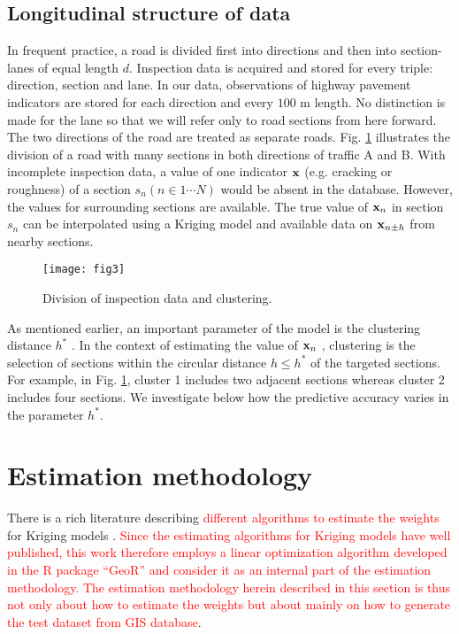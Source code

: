 \documentclass[Journal]{ascelike}
\begin{document}
\subsection{Longitudinal structure of data} \label{krigmodel2}
In frequent practice, a road is divided first into directions and then into section-lanes of equal length $d$. 
Inspection data is acquired and stored for every triple: direction, section and lane. In our data, observations of 
highway pavement indicators are stored for each direction and every $100$ m length. No distinction is made for the lane 
so that we will refer only to road sections from here forward. The two directions of the road are treated as separate 
roads. Fig. \ref{fig3} illustrates the division of a road with many sections in both directions of traffic A and B. With 
incomplete inspection data, a value of one indicator $\bold x$ (e.g. cracking or roughness) of a section $s_n(n \in 1 \cdots 
N )$ would be absent in the database. However, the values for surrounding sections are available. The true value of 
$\bold x_n$ in section $s_n$ can be interpolated using a Kriging model and available data on $\bold x_{n\pm h}$ from nearby 
sections.

%
\begin{figure}
\centering
\texttt{[image: fig3]} 
\caption{Division of inspection data and clustering.} 
\label{fig3}
\end{figure}
%

As mentioned earlier, an important parameter of the model is the clustering distance $h^*$ . In
the context of estimating the value of $\bold x_n$ , clustering is the selection of sections within the
circular distance $h \le h^*$ of the targeted sections. For example, in Fig. \ref{fig3}, cluster 1 includes
two adjacent sections whereas cluster 2 includes four sections. We investigate below how the
predictive accuracy varies in the parameter $h^*$.
\section{Estimation methodology} \label{krigestimate}
There is a rich literature describing \textcolor{red}{different algorithms to estimate the weights} for Kriging models \cite{Wackernagel1998}. \textcolor{red}{Since the estimating algorithms for Kriging models have well published, this work therefore employs a linear optimization algorithm developed in the R package ``GeoR'' \cite{Diggle2001,Diggle2007} and consider it as an internal part of the estimation methodology. The estimation methodology herein described in this section is thus not only about how to estimate the weights but about mainly on how to generate the test dataset from GIS database}. 
\end{document}
